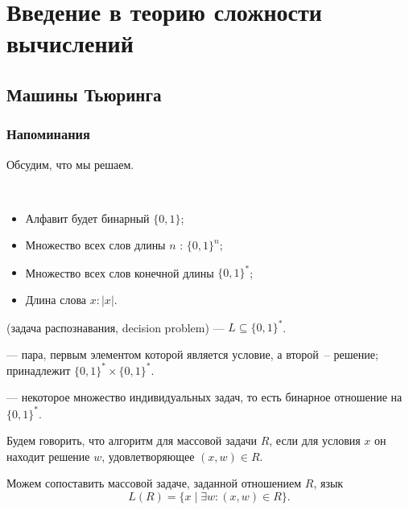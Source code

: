 \chapter{Введение в теорию сложности вычислений}

\section{Машины Тьюринга}
\subsection{Напоминания}
Обсудим, что мы решаем.
\begin{name}
	~\begin{itemize}[noitemsep]
		\item Алфавит будет бинарный  $\{0, 1\}$;
		\item Множество всех слов длины $ n$ : $ \{0, 1\}^{n}$;
		\item Множество всех слов конечной длины  $ \{0, 1\}^{*}$;
		\item Длина слова $ x\colon  \lvert x \rvert $.
	\end{itemize}
\end{name}

\begin{defn}
    \begin{description}
	\item {} (задача распознавания, decision problem) ---  $ L \subseteq \{0, 1\}^{*}$.
	
    \item {} --- пара,
	первым элементом которой является условие, а второй~-- решение;
	принадлежит $ \{0, 1\}^{*} \times \{0, 1\}^{*}$.
	
	\item{} --- некоторое множество индивидуальных задач, то есть бинарное отношение на $ \{0, 1\}^{*}$.
	\end{description}
\end{defn}

\begin{defn}
	Будем говорить, что алгоритм  для массовой задачи $ R$, если для условия $ x$ он находит решение $ w$, удовлетворяющее $ (x, w) \in R$.

	\noindent
	Можем сопоставить массовой задаче, заданной отношением $ R$, язык
	\[
		L(R) = \{x \mid \exists w\colon (x, w) \in R\}
	.\]
\end{defn}

